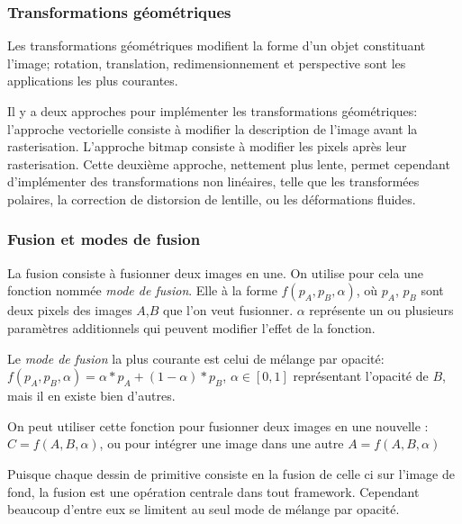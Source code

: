 			\subsubsection{Transformations géométriques}
				Les transformations géométriques modifient la forme d'un objet constituant l'image; rotation, translation, 
				redimensionnement et perspective sont les applications les plus courantes. 
				
				Il y a deux approches pour implémenter les transformations
				géométriques: l'approche vectorielle consiste à modifier la description de l'image avant la rasterisation. L'approche
				bitmap consiste à modifier les pixels après leur rasterisation. Cette deuxième approche, nettement plus lente, permet
				cependant d'implémenter des transformations non linéaires, telle que les transformées polaires, la correction de distorsion de 
				lentille, ou les déformations fluides. 
				
			\subsubsection{Fusion et modes de fusion}
				La fusion consiste à fusionner deux images en une. On utilise pour cela une fonction nommée \emph{mode de fusion}.
				Elle à la forme $f(p_A ,p_B ,\alpha)$, où $p_A$, $p_B$ sont deux pixels des images $A$,$B$ que l'on veut fusionner. 
				$\alpha$ représente un ou plusieurs paramètres additionnels qui peuvent	modifier l'effet de la fonction.

				Le \emph{mode de fusion} la plus courante est celui de mélange par opacité: $f(p_A, p_B, \alpha) = \alpha * p_A + (1-\alpha) * p_B$,  $\alpha \in [0,1]$ 
				représentant l'opacité de $B$, mais il en existe bien d'autres.

				On peut utiliser cette fonction pour fusionner deux images en une nouvelle : $ C = f(A,B,\alpha)$, ou pour intégrer une image dans
				une autre $A = f(A,B,\alpha)$

				Puisque chaque dessin de primitive consiste en la fusion de celle ci sur l'image de fond, la fusion est une opération centrale
				dans tout framework. Cependant beaucoup d'entre eux se limitent au seul mode de mélange par opacité.

